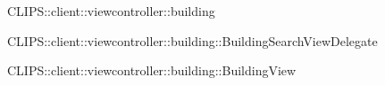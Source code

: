 \begin{componente}{CLIPS::client::viewcontroller::building}
\begin{compClassi}
\begin{classe}{CLIPS::client::viewcontroller::building::BuildingSearchViewDelegate}
\end{classe}\begin{classe}{CLIPS::client::viewcontroller::building::BuildingView}
\begin{classeRelazioni}

\end{classeRelazioni}
\end{classe}
\end{compClassi}
\end{componente}
